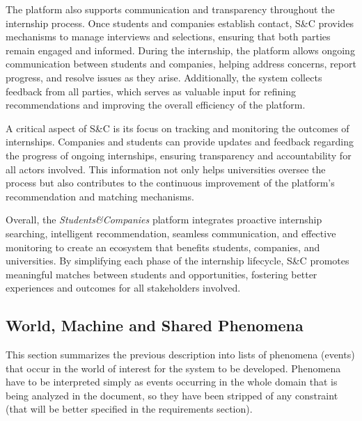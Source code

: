 The platform also supports communication and transparency throughout the internship process. Once students and companies establish contact, S\&C provides mechanisms to manage interviews and selections, ensuring that both parties remain engaged and informed. During the internship, the platform allows ongoing communication between students and companies, helping address concerns, report progress, and resolve issues as they arise. Additionally, the system collects feedback from all parties, which serves as valuable input for refining recommendations and improving the overall efficiency of the platform.

A critical aspect of S\&C is its focus on tracking and monitoring the outcomes of internships. Companies and students can provide updates and feedback regarding the progress of ongoing internships, ensuring transparency and accountability for all actors involved. This information not only helps universities oversee the process but also contributes to the continuous improvement of the platform’s recommendation and matching mechanisms.

Overall, the \textit{Students\&Companies} platform integrates proactive internship searching, intelligent recommendation, seamless communication, and effective monitoring to create an ecosystem that benefits students, companies, and universities. By simplifying each phase of the internship lifecycle, S\&C promotes meaningful matches between students and opportunities, fostering better experiences and outcomes for all stakeholders involved.

\subsection{World, Machine and Shared Phenomena}

This section summarizes the previous description into lists of phenomena (events) that occur in the
world of interest for the system to be developed. Phenomena have to be interpreted simply as events
occurring in the whole domain that is being analyzed in the document, so they have been stripped of
any constraint (that will be better specified in the requirements section).

